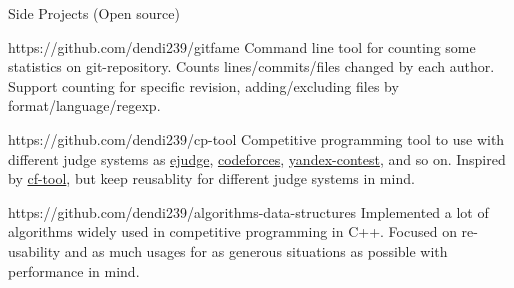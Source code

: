 
\begin{projects}{Side Projects (Open source)}

{https://github.com/dendi239/gitfame}
{Command line tool for counting some statistics on git-repository.
Counts lines/commits/files changed by each author.
Support counting for specific revision, adding/excluding files by format/language/regexp.
}


{https://github.com/dendi239/cp-tool}
{Competitive programming tool to use with different judge systems as \href{https://ejudge.ru}{ejudge}, \href{https://codeforces.com}{codeforces}, \href{https://contest.yandex.ru}{yandex-contest}, and so on.
Inspired by \href{https://github.com/xalanq/cf-tool}{cf-tool}, but keep reusablity for different judge systems in mind.
}

{https://github.com/dendi239/algorithms-data-structures}
{Implemented a lot of algorithms widely used in competitive programming in C++. Focused on re-usability and as much usages for as generous situations as possible with performance in mind.
}

\end{projects}
